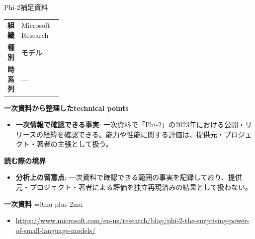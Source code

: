 \begin{technicalnote}{Phi-2}{補足資料}
\begingroup
\begin{tabularx}{\linewidth}{@{}>{\bfseries}p{0.22\linewidth}X@{}}
組織 & Microsoft Research \\
種別 & モデル \\
時系列 & — \\
\end{tabularx}
\smallskip
{\bfseries 一次資料から整理したtechnical points}
\begin{itemize}[leftmargin=1.5em,itemsep=0.35em]
\item \textbf{一次情報で確認できる事実}: 一次資料で「Phi-2」の2023年における公開・リリースの経緯を確認できる。能力や性能に関する評価は、提供元・プロジェクト・著者の主張として扱う。
\end{itemize}
\begin{minipage}{\linewidth}
{\bfseries 読む際の境界}
\begin{itemize}[leftmargin=1.5em,itemsep=0.35em]
\item \textbf{分析上の留意点}: 一次資料で確認できる範囲の事実を記録しており、提供元・プロジェクト・著者による評価を独立再現済みの結果として扱わない。
\end{itemize}
\begin{samepage}
{\bfseries 一次資料}
\begingroup\sloppy
\Urlmuskip=0mu plus 2mu\relax
\begin{itemize}[leftmargin=1.5em,itemsep=0.25em]
\item {\scriptsize\url{https://www.microsoft.com/en-us/research/blog/phi-2-the-surprising-power-of-small-language-models/}}
\end{itemize}
\endgroup
\end{samepage}
\end{minipage}
\endgroup
\end{technicalnote}
\medskip
